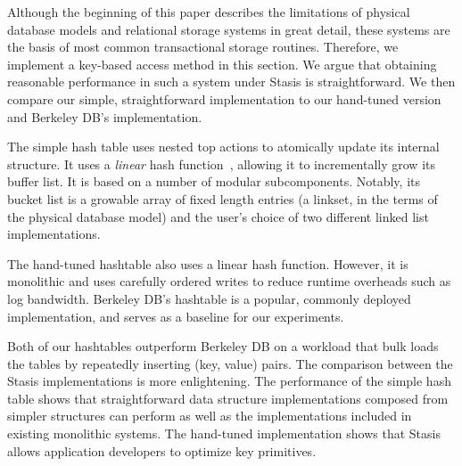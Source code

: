 \documentclass[letterpaper,twocolumn,10pt]{article}
\newcommand{\yad}{Stasis\xspace}
\begin{document}
Although the beginning of this paper describes the limitations of
physical database models and relational storage systems in great
detail, these systems are the basis of most common transactional
storage routines.  Therefore, we implement a key-based access 
method in this section. We argue that 
obtaining reasonable performance in such a system under \yad is
straightforward.  We then compare our simple, straightforward 
implementation to our hand-tuned version and Berkeley DB's implementation.

The simple hash table uses nested top actions to atomically update its
internal structure.  It uses a {\em linear} hash function~\cite{lht}, allowing
it to incrementally grow its buffer list.  It is based on a number of
modular subcomponents.  Notably, its bucket list is a growable array
of fixed length entries (a linkset, in the terms of the physical
database model) and the user's choice of two different linked list
implementations.

The hand-tuned hashtable also uses a linear hash
function.  However, it is monolithic and uses carefully ordered writes to
reduce runtime overheads such as log bandwidth.  Berkeley DB's
hashtable is a popular, commonly deployed implementation, and serves
as a baseline for our experiments.

Both of our hashtables outperform Berkeley DB on a workload that
bulk loads the tables by repeatedly inserting (key, value) pairs.
The comparison between the \yad  implementations is more
enlightening.  The performance of the simple hash table shows that
straightforward data structure implementations composed from
simpler structures can perform as well as the implementations included 
in existing monolithic systems.  The hand-tuned
implementation shows that \yad allows application developers to
optimize key primitives.


\end{document}
